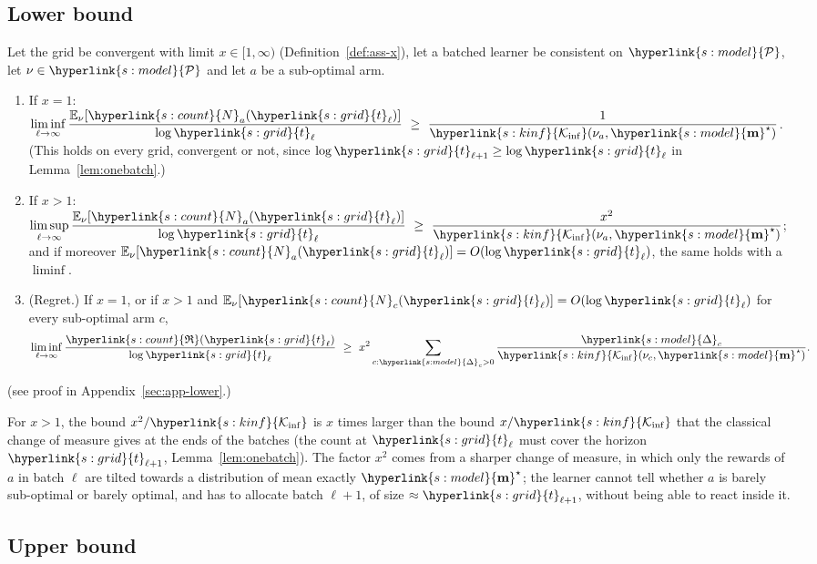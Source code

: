 \documentclass[10pt]{article}
\newcommand{\sy}[2]{{\hyperlink{#1}{#2}}}
\newcommand{\E}{\mathbb{E}}
\newcommand{\1}{\mathbf{1}}
\newcommand{\m}{\sy{s:model}{\mathbf{m}}}
\newcommand{\cP}{\sy{s:model}{\mathcal P}}
\newcommand{\Dg}{\sy{s:model}{\Delta}}
\newcommand{\Ki}{\sy{s:kinf}{\mathcal K_{\inf}}}
\newcommand{\Ng}{\sy{s:count}{N}}
\newcommand{\Reg}{\sy{s:count}{\mathfrak R}}
\newcommand{\tl}{\sy{s:grid}{t}}
\begin{document}
\subsection{Lower bound}

\begin{theorem}\label{thm:lower}
Let the grid be convergent with limit $x\in[1,\infty)$ (Definition~\ref{def:ass-x}), let a batched learner be consistent on $\cP$, let $\nu\in\cP$ and let $a$ be a sub-optimal arm.
\begin{enumerate}[label=(\roman*),leftmargin=*]
\item If $x=1$: $\displaystyle\liminf_{\ell\to\infty}\frac{\E_\nu[\Ng_a(\tl_\ell)]}{\log\tl_\ell}\ \ge\ \frac1{\Ki(\nu_a,\m^\star)}$. (This holds on every grid, convergent or not,
since $\log\tl_{\ell+1}\ge\log\tl_\ell$ in Lemma~\ref{lem:onebatch}.)
\item If $x>1$: $\displaystyle\limsup_{\ell\to\infty}\frac{\E_\nu[\Ng_a(\tl_\ell)]}{\log\tl_\ell}\ \ge\ \frac{x^2}{\Ki(\nu_a,\m^\star)}$; and if moreover
$\E_\nu[\Ng_a(\tl_\ell)]=O(\log\tl_\ell)$, the same holds with a $\liminf$.
\item (Regret.) If $x=1$, or if $x>1$ and $\E_\nu[\Ng_c(\tl_\ell)]=O(\log\tl_\ell)$ for every sub-optimal arm $c$,
\[
\liminf_{\ell\to\infty}\frac{\Reg(\tl_\ell)}{\log\tl_\ell}\ \ge\ x^2\sum_{c:\Dg_c>0}\frac{\Dg_c}{\Ki(\nu_c,\m^\star)} .
\]
\end{enumerate}
\end{theorem}
\noindent(see proof in Appendix~\ref{sec:app-lower}.)

\noindent For $x>1$, the bound $x^2/\Ki$ is $x$ times larger than the bound $x/\Ki$ that the classical change of measure gives at the ends of the batches (the
count at $\tl_\ell$ must cover the horizon $\tl_{\ell+1}$, Lemma~\ref{lem:onebatch}). The factor $x^2$ comes from a sharper change of measure, in which only the rewards of
$a$ in batch $\ell$ are tilted towards a distribution of mean exactly $\m^\star$; the learner cannot tell whether $a$ is barely sub-optimal or barely optimal, and has
to allocate batch $\ell+1$, of size $\approx\tl_{\ell+1}$, without being able to react inside it.

\subsection{Upper bound}
\end{document}
